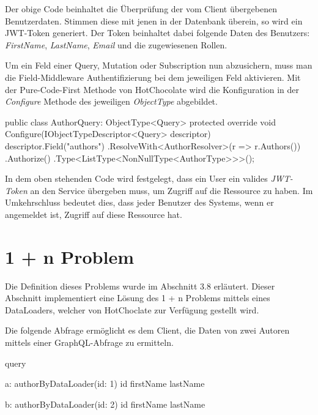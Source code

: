 Der obige Code beinhaltet die Überprüfung der vom Client übergebenen Benutzerdaten.
Stimmen diese mit jenen in der Datenbank überein, so wird ein JWT-Token generiert.
Der Token beinhaltet dabei folgende Daten des Benutzers: \textit{FirstName}, \textit{LastName}, \textit{Email} und die zugewiesenen Rollen.

Um ein Feld einer Query, Mutation oder Subscription nun abzusichern, muss man die Field-Middleware Authentifizierung bei dem jeweiligen Feld aktivieren.
Mit der Pure-Code-First Methode von HotChocolate wird die Konfiguration in der \textit{Configure} Methode des jeweiligen \textit{ObjectType} abgebildet.

\begin{JsCode}
public class AuthorQuery: ObjectType<Query> {
    protected override void Configure(IObjectTypeDescriptor<Query> descriptor) {
        descriptor.Field("authors")
            .ResolveWith<AuthorResolver>(r => r.Authors())
            .Authorize()
            .Type<ListType<NonNullType<AuthorType>>>();
    }
}
\end{JsCode}

In dem oben stehenden Code wird festgelegt, dass ein User ein valides \textit{JWT-Token} an den Service übergeben muss, um Zugriff auf die Ressource zu haben.
Im Umkehrschluss bedeutet dies, dass jeder Benutzer des Systems, wenn er angemeldet ist, Zugriff auf diese Ressource hat.
\newline

\section{1 + n Problem}
Die Definition dieses Problems wurde im Abschnitt 3.8 erläutert.
Dieser Abschnitt implementiert eine Lösung des 1 + n Problems mittels eines DataLoaders, welcher von HotChoclate zur Verfügung gestellt wird.
\newline

Die folgende Abfrage ermöglicht es dem Client, die Daten von zwei Autoren mittels einer GraphQL-Abfrage zu ermitteln.
\begin{JsCode}
query {
    a: authorByDataLoader(id: 1) {
        id
        firstName
        lastName
    }
    
    b: authorByDataLoader(id: 2) {
        id
        firstName
        lastName
    }
}
\end{JsCode}

